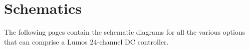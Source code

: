 \documentclass[letterpaper,twoside,onecolumn,openright,final]{memoir}
\begin{document}


\chapter{Schematics}
The following pages contain the schematic diagrams for all the various options that can comprise
a Lumos 24-channel DC controller.

\begin{figure}
\end{figure}
\begin{figure}
\end{figure}
\begin{figure}
\end{figure}
\begin{figure}
\end{figure}
\end{document}
